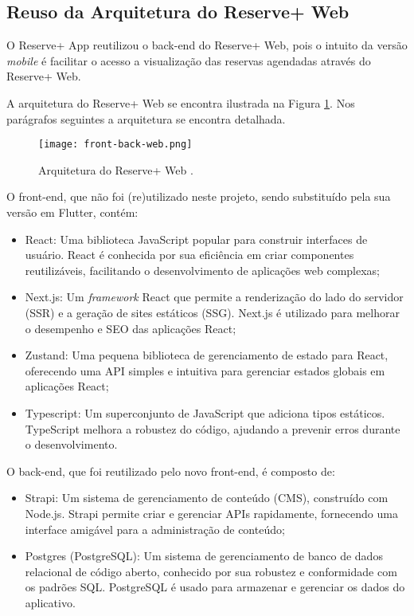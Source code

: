 \documentclass[12pt]{article}
\begin{document}
\subsection{Reuso da Arquitetura do Reserve+ Web} \label{sec:reuse-architecture}

O Reserve+ App reutilizou o back-end do Reserve+ Web, pois o intuito da versão \textit{mobile} é facilitar o acesso a visualização das reservas agendadas através do Reserve+ Web.

A arquitetura do Reserve+ Web \cite{cotrim} se encontra ilustrada na Figura \ref{fig:front-back-web}. Nos parágrafos seguintes a arquitetura se encontra detalhada.

\begin{figure}[ht]
\centering
\texttt{[image: front-back-web.png]}
\caption{Arquitetura do Reserve+ Web \cite{cotrim}.}
\label{fig:front-back-web}
\end{figure}

O front-end, que não foi (re)utilizado neste projeto, sendo substituído pela sua versão em Flutter, contém:

\begin{itemize}
    \item React: Uma biblioteca JavaScript popular para construir interfaces de usuário. React é conhecida por sua eficiência em criar componentes reutilizáveis, facilitando o desenvolvimento de aplicações web complexas;
    \item Next.js: Um \textit{framework} React que permite a renderização do lado do servidor (SSR) e a geração de sites estáticos (SSG). Next.js é utilizado para melhorar o desempenho e SEO das aplicações React;
    \item Zustand: Uma pequena biblioteca de gerenciamento de estado para React, oferecendo uma API simples e intuitiva para gerenciar estados globais em aplicações React;
    \item Typescript: Um superconjunto de JavaScript que adiciona tipos estáticos. TypeScript melhora a robustez do código, ajudando a prevenir erros durante o desenvolvimento.
\end{itemize}

O back-end, que foi reutilizado pelo novo front-end, é composto de:

\begin{itemize}
    \item Strapi: Um sistema de gerenciamento de conteúdo (CMS), construído com Node.js. Strapi permite criar e gerenciar APIs rapidamente, fornecendo uma interface amigável para a administração de conteúdo;
    \item Postgres (PostgreSQL): Um sistema de gerenciamento de banco de dados relacional de código aberto, conhecido por sua robustez e conformidade com os padrões SQL. PostgreSQL é usado para armazenar e gerenciar os dados do aplicativo.
\end{itemize}
\end{document}
